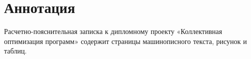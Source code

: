 \section*{Аннотация}
Расчетно-пояснительная записка к дипломному проекту «Коллективная оптимизация программ» содержит  страницы машинописного текста,  рисунок и  таблиц. 
{}